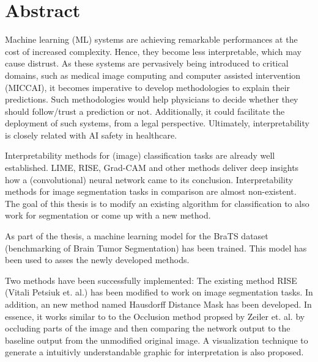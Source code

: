 \chapter*{Abstract}
\label{chap:managementSummary}

Machine learning (ML) systems are achieving remarkable performances at the cost of increased complexity. Hence, they become less interpretable, which may cause distrust. As these systems are pervasively being introduced to critical domains, such as medical image computing and computer assisted intervention (MICCAI), it becomes imperative to develop methodologies to explain their predictions. Such methodologies would help physicians to decide whether they should follow/trust a prediction or not. Additionally, it could facilitate the deployment of such systems, from a legal perspective. Ultimately, interpretability is closely related with AI safety in healthcare.

Interpretability methods for (image) classification tasks are already well established. LIME, RISE, Grad-CAM and other methods deliver deep insights how a (convolutional) neural network came to its conclusion. Interpretability methods for image segmentation tasks in comparison are almost non-existent. The goal of this thesis is to modify an existing algorithm for classification to also work for segmentation or come up with a new method.

As part of the thesis, a machine learning model for the BraTS dataset (benchmarking of Brain Tumor Segmentation) has been trained. This model has been used to asses the newly developed methods.

Two methods have been successfully implemented: The existing method RISE (Vitali Petsiuk et. al.) has been modified to work on image segmentation tasks. In addition, an new method named Hausdorff Distance Mask has been developed. In essence, it works similar to to the Occlusion method propsed by Zeiler et. al. by occluding parts of the image and then comparing the network output to the baseline output from the unmodified original image. A visualization technique to generate a intuitivly understandable graphic for interpretation is also proposed.